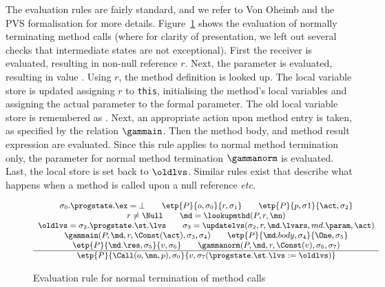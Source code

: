 The evaluation rules are fairly standard, and we refer to Von Oheimb
and the PVS formalisation for more details.  Figure~\ref{FigEvalRules}
shows the evaluation of normally terminating method calls (where for
clarity of presentation, we left out several checks that intermediate
states are not exceptional).  First the receiver is evaluated,
resulting in non-null reference \(r\).  Next, the parameter is
evaluated, resulting in value \act. Using \(r\), the method definition
\md is looked up.  The local variable store is updated assigning
\(r\) to \texttt{this}, initialising the
method's local variables and assigning the actual parameter to the
formal parameter. The old local variable store is remembered as \oldlvs.
Next, an appropriate action upon method entry is taken, as specified
by the relation \(\gammain\).
Then the method body, and method result expression are
evaluated. Since this rule applies to normal method termination only,
the parameter for normal method termination
\(\gammanorm\) is evaluated. Last, the local store is set back to
\(\oldlvs\). %
Similar rules exist that describe what happens
when a method is called upon a null reference \emph{etc.}



\begin{figure}[t]
\[{\small
\begin{array}{c}
\sigma_0.\progstate.\ex = \bot \qquad        %
\etp{P}{o, \sigma_0}{r,\sigma_1} \qquad      %
\etp{P}{p, \sigma1}{\act, \sigma_2}\\        %
r \not= \Null \qquad                         %
\md = \lookupmthd(P, r, \mn) \\
\oldlvs = \sigma_2.\progstate.\st.\lvs \qquad
\sigma_3 = \updatelvs(\sigma_2, r, \md.\lvars, md.\param, \act) \\
\gammain(P, \md, r, \Const(\act), \sigma_3, \sigma_4) \qquad
\etp{P}{\md.body, \sigma_4}{\One,\sigma_5} \\
\etp{P}{\md.\res, \sigma_5}{v,\sigma_6}\qquad
\gammanorm(P, \md, r, \Const(v), \sigma_6, \sigma_7)\\
\hline
\etp{P}{\Call(o,\mn,p), \sigma_0}{v, \sigma_7
(\progstate.\st.\lvs := \oldlvs)}
\end{array}}
\]
\caption{Evaluation rule for normal termination of method
calls}\label{FigEvalRules}
\end{figure}

